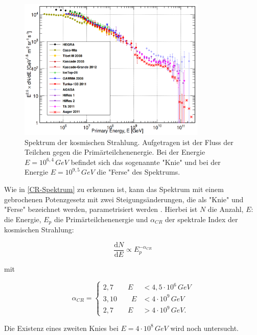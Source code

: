 \begin{figure}
    \centering
    \includegraphics[width=0.8\textwidth]{./Plots/02_Astroteilchenphysik/CosmicRaySpectrum.png}
    \caption{Spektrum der kosmischen Strahlung. 
      Aufgetragen ist der Fluss der Teilchen gegen die Primärteilchenenergie. 
      Bei der Energie $E=10^{6,4}\,\si{GeV}$ befindet sich das sogenannte "Knie" und bei der Energie $E=10^{9,5}\,\si{GeV}$ die "Ferse" des Spektrums. \cite{GaisserSpektrum}}
    \label{CR-Spektrum}
\end{figure}



Wie in \autoref{CR-Spektrum} zu erkennen ist, kann das Spektrum mit einem gebrochenen Potenzgesetz mit zwei Steigungsänderungen, die als "Knie" und "Ferse" bezeichnet werden, parametrisiert werden \cite{Knie}.
Hierbei ist $N$ die Anzahl, $E$: die Energie, $E_p$ die Primärteilchenenergie und $\alpha_{CR}$ der spektrale Index der kosmischen Strahlung:

\begin{equation}
 \frac{\mathrm{d}N}{\mathrm{d}E} \propto E_p^{-\alpha_{CR}}
\end{equation}

mit\cite{Knie} 

\begin{equation*}
\alpha_{CR}=	
\left\{
\begin{aligned}
2,7 \qquad E  &< 4,5\cdot10^6\,\si{GeV} \\
3,10 \qquad E  &< 4\cdot10^9\,\si{GeV} \\ 
2,7 \qquad E &> 4\cdot10^9\,\si{GeV}.
\end{aligned}
\right.
\end{equation*}

Die Existenz eines zweiten Knies bei $E=4\cdot 10^8\,\si{GeV}$\cite{Knie} wird noch untersucht.


